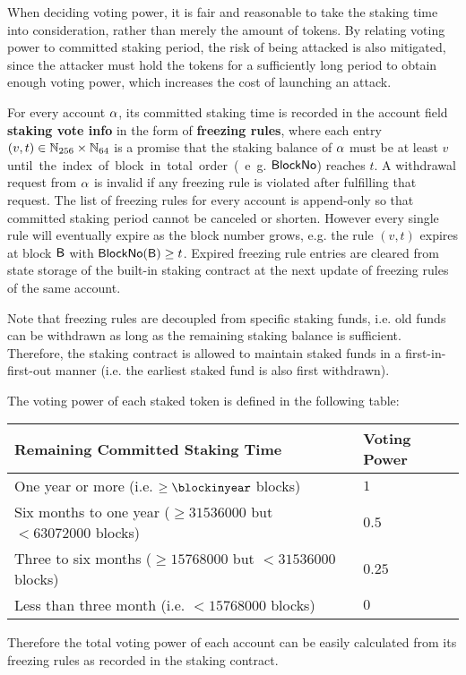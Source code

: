 When deciding voting power, it is fair and reasonable to take the staking time into consideration,
rather than merely the amount of tokens.
By relating voting power to committed staking period, the risk of being attacked is also mitigated,
since the attacker must hold the tokens for a sufficiently long period to obtain enough voting power, which increases the cost of launching an attack.

For every account $\mathbf{\alpha}$, its committed staking time is recorded in the account field {\bf staking vote info} in the form of 
{\bf freezing rules},
where each entry $(v,t)\in \mathbb{N}_{256}\times\mathbb{N}_{64}$ is a promise that the  staking balance of $\mathbf{\alpha}$ must be at least $v$ \unit until the index of block in total order (e.g. $\mathsf{BlockNo}$) reaches $t$.
A withdrawal request from $\mathbf{\alpha}$ is invalid if any freezing rule is violated after fulfilling that request.
The list of freezing rules for every account is append-only so that committed staking period cannot be canceled or shorten.
However every single rule will eventually expire as the block number grows, e.g. the rule $(v,t)$ expires at block $\textsf{B}$ with $\mathsf{BlockNo}(\textsf{B})\ge t$. 
Expired freezing rule entries are cleared from state storage of the built-in staking contract at the next update of freezing rules of the same account.	

Note that freezing rules are decoupled from specific staking funds, i.e. old funds can be withdrawn as long as the remaining staking balance is sufficient. 
Therefore, the staking contract is allowed to maintain staked funds in a first-in-first-out manner (i.e. the earliest staked fund is also first withdrawn).


The voting power of each staked token is defined in the following table:

\par
\begin{center}
\begin{tabular}{ll}
\toprule
Remaining Committed Staking Time & Voting Power \\
\midrule
One year or more (i.e. $\ge \blockinyear$ blocks) & $1$  \\
Six months to one year ($\ge 31536000$ but $<63072000$ blocks) & $0.5$ \\
Three to six months ($\ge 15768000$ but $<31536000$ blocks) & $0.25$\\
Less than three month (i.e. $< 15768000$ blocks) & $0$ \\
\bottomrule
\end{tabular}
\end{center}
\par
Therefore the total voting power of each account can be easily calculated from its freezing rules as recorded in the staking contract.

